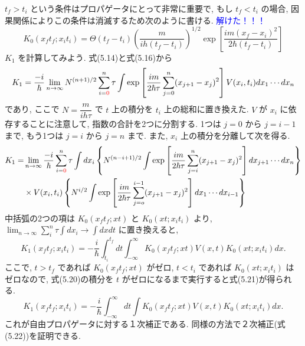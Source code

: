 \documentclass[a4paper,12pt]{article}
\begin{document}
$t_{f} > t_i$ という条件はプロパゲータにとって非常に重要で, もし $t_{f} < t_i$ の場合, 因果関係によりこの条件は消滅するため次のように書ける. \textcolor{blue}{解けた！！！}
\begin{equation*}
    K_{0}(x_{f}t_{f}; x_{i}t_{i}) = \Theta(t_{f} - t_{i})\left( \frac{m}{ih(t_{f} - t_{i})} \right)^{1/2} \exp\left[ \frac{im(x_{f} - x_{i})^2}{2\hbar(t_{f} - t_{i})} \right] \tag{5.19}
\end{equation*}
$K_{1}$ を計算してみよう. 式(5.14)と式(5.16)から
\begin{equation*}
    K_{1} = \frac{-i}{\hbar}\lim_{n \rightarrow \infty} N^{(n+1)/2}\sum_{i=\textcolor{red}{0}}^{n}\tau\int\exp\left[ \frac{im}{2\hbar\tau}\sum_{j=0}^{n}(x_{j+1} - x_{j})^2 \right] V(x_{i}, t_{i}) dx_1 \cdots dx_{n}
\end{equation*}
であり, ここで $N = \dfrac{m}{ih\tau}$ で $t$ 上の積分を $t_{i}$ 上の総和に置き換えた. $V$ が $x_{i}$ に依存することに注意して, 指数の合計を2つに分割する. 1つは $j=0$ から $j=i-1$ まで, もう1つは $j=i$ から $j=n$ まで. また, $x_{i}$ 上の積分を分離して次を得る.
\begin{align*}
    K_1 = &\lim_{n\rightarrow\infty}\frac{-i}{\hbar}\sum_{i=\textcolor{red}{0}}^{n}\tau\int dx_{i} \left\{ N^{(n-i+1)/2}\int\exp\left[ \frac{im}{2\hbar\tau}\sum_{j=i}^{n}(x_{j+1} - x_{j})^2 \right]dx_{j+1}\cdots dx_{n} \right\}\\
    &\times V(x_{i}, t_{i})\left\{ N^{i/2}\int\exp \left[ \frac{im}{2\hbar\tau}\sum_{j=o}^{i-1}(x_{j+1} - x_{j})^2 \right] dx_1 \cdots dx_{i-1} \right\} 
\end{align*}
中括弧の2つの項は $K_{0}(x_{f}t_{f}; xt)$ と $K_{0}(xt; x_{i}t_{i})$ より, $\displaystyle \lim_{n \to \infty} \sum_{i}^{n}\tau\int dx_{i} \to \int dx dt$ に置き換えると,
\begin{equation*}
    K_{1}(x_{f}t_{f}; x_{i}t_{i}) = -\frac{i}{\hbar}\int_{t_i}^{t_f}dt\int_{-\infty}^{\infty} K_{0}(x_{f}t_{f}; xt)V(x, t)K_{0}(xt; x_{i}t_{i})dx. \tag{5.20}
\end{equation*}
ここで, $t > t_f$ であれば $K_{0}(x_{f}t_{f}; xt)$ がゼロ, $t < t_i$ であれば $K_{0}(xt; x_{i}t_{i})$ はゼロなので, 式(5.20)の積分を $t$ がゼロになるまで実行すると式(5.21)が得られる.
\begin{equation*}
    K_{1}(x_{f}t_{f}; x_{i}t_{i}) = -\frac{i}{\hbar}\int_{-\infty}^{\infty}dt\int K_{0}(x_{f}t_{f}; xt)V(x, t)K_{0}(xt; x_{i}t_{i})dx. \tag{5.21}
\end{equation*}
これが自由プロパゲータに対する１次補正である. 同様の方法で２次補正(式(5.22))を証明できる.
\end{document}
